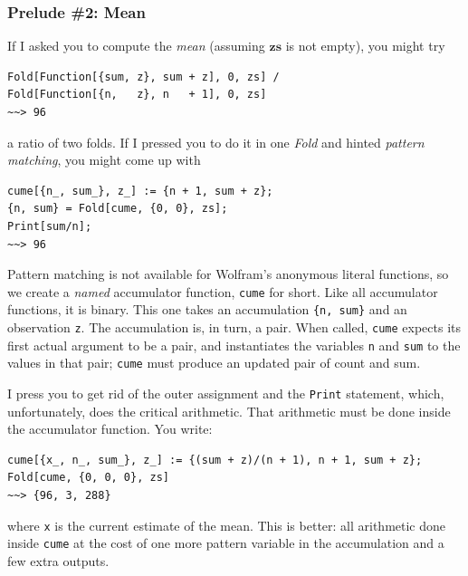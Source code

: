 \documentclass[10pt,oneside,x11names]{article}
\begin{document}
\subsubsection{Prelude \#2: Mean}
\label{sec:orgheadline6}

If I asked you to compute the \emph{mean} (assuming \(\mathbold{zs}\) is not
empty), you might try

\begin{verbatim}
Fold[Function[{sum, z}, sum + z], 0, zs] /
Fold[Function[{n,   z}, n   + 1], 0, zs] 
~~> 96
\end{verbatim}

\noindent a ratio of two folds.
If I pressed you to do it in one \emph{Fold} and hinted \emph{pattern matching},
you might come up with

\begin{verbatim}
cume[{n_, sum_}, z_] := {n + 1, sum + z};
{n, sum} = Fold[cume, {0, 0}, zs];
Print[sum/n];
~~> 96
\end{verbatim}

Pattern matching is not available for Wolfram's anonymous literal functions, so
we create a \emph{named} accumulator function, \texttt{cume} for short.
Like all accumulator functions, it is binary. This one takes an accumulation
\texttt{\{n, sum\}} and an observation \texttt{z}. The accumulation is, in turn, a pair. When
called, \texttt{cume} expects its first actual argument to be a pair, and
instantiates the variables \texttt{n} and \texttt{sum} to the values in that pair;
\texttt{cume} must produce an updated pair of count and sum.

I press you to get rid of the outer assignment and the \texttt{Print} statement, which,
unfortunately, does the critical arithmetic. That arithmetic must be done inside
the accumulator function. You write:

\begin{verbatim}
cume[{x_, n_, sum_}, z_] := {(sum + z)/(n + 1), n + 1, sum + z};
Fold[cume, {0, 0, 0}, zs]
~~> {96, 3, 288}
\end{verbatim}

\noindent where \texttt{x} is the current estimate of the mean. This is better:
all arithmetic done inside \texttt{cume} at the cost of one more
pattern variable in the accumulation and a few extra outputs.
\end{document}
